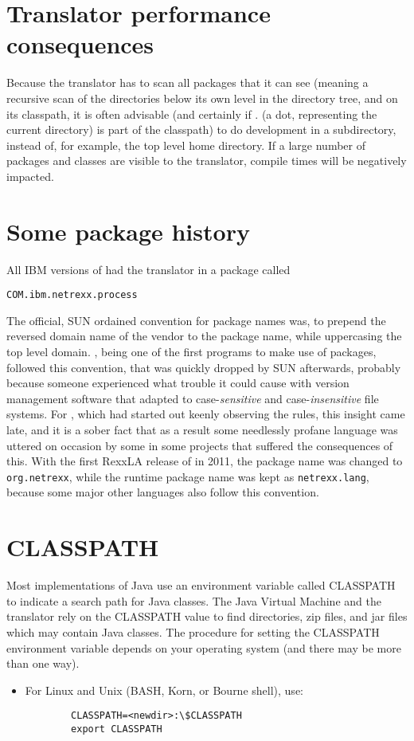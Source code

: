 {\section{Translator performance consequences}
Because the \nr{} translator has to scan all packages that it can
see (meaning a recursive scan of the directories below its own level
in the directory tree, and on its classpath, it is often advisable
(and certainly if . (a dot, representing the current directory) is part of the classpath)
to do development in a subdirectory, instead of, for example, the top
level home directory. If a large number of packages and classes are
visible to the translator, compile times will be negatively impacted. 

\section{Some \nr{} package history}
All IBM versions of \nr{} had the translator in a package called
\begin{verbatim}
COM.ibm.netrexx.process 
\end{verbatim}
The official, SUN ordained
convention for package names was, to prepend the reversed domain name
of the vendor to the package name, while uppercasing the top level
domain. \nr{}, being one of the first programs to make use of
packages, followed this convention, that was quickly dropped by SUN
afterwards, probably because someone experienced what trouble it could
cause with version management software that adapted to
case-\emph{sensitive} and case-\emph{insensitive} file systems. For
\nr{}, which had started out keenly observing the rules, this
insight came late, and it is a sober fact that as a result some needlessly profane
language was uttered on occasion by some in some projects that suffered the consequences of
this. With the first RexxLA release of \nr{} in 2011, the package
name was changed to \texttt{org.netrexx}, while the runtime package
name was kept as \texttt{netrexx.lang}, because some major other
languages also follow this convention.
\section{CLASSPATH}
Most implementations of Java use an environment variable called
CLASSPATH to indicate a search path for Java classes. The Java Virtual
Machine and the \nr{} translator rely on the CLASSPATH value to find directories, zip files, and jar files which may contain Java classes. 
The procedure for setting the CLASSPATH environment variable depends on your operating system (and there may be more than one way).
\begin{itemize}
\item For Linux and Unix (BASH, Korn, or Bourne shell), use:
\begin{verbatim}
        CLASSPATH=<newdir>:\$CLASSPATH 
        export CLASSPATH
\end{verbatim}


\end{itemize}}
